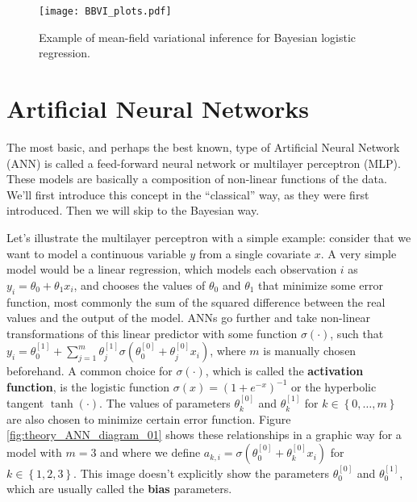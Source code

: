 \begin{figure}[H]
    \centering
    \texttt{[image: BBVI\_plots.pdf]}
    \caption{Example of mean-field variational inference for Bayesian logistic regression.}
    \label{fig:BBVI_plots}
\end{figure}


\section{Artificial Neural Networks}

The most basic, and perhaps the best known, type of Artificial Neural Network (ANN) is called a feed-forward neural network or multilayer perceptron (MLP). These models are basically a composition of non-linear functions of the data. We'll first introduce this concept in the ``classical'' way, as they were first introduced. Then we will skip to the Bayesian way.

Let's illustrate the multilayer perceptron with a simple example: consider that we want to model a continuous variable $y$ from a single covariate $x$. A very simple model would be a linear regression, which models each observation $i$ as $y_i = \theta_0 + \theta_1 x_i$, and chooses the values of $\theta_0$ and $\theta_1$ that minimize some error function, most commonly the sum of the squared difference between the real values and the output of the model. ANNs go further and take non-linear transformations of this linear predictor with some function $\sigma(\cdot)$, such that $y_i = \theta_0^{[1]} +  \sum_{j = 1}^m \theta_j^{[1]} \sigma \left( \theta_0^{[0]} + \theta_j^{[0]} x_i \right)$, where $m$ is manually chosen beforehand. A common choice for $\sigma(\cdot)$, which is called the \textbf{activation function}, is the logistic function $\sigma(x) = (1 + e^{-x})^{-1}$
or the hyperbolic tangent $\tanh(\cdot)$. The values of parameters $\theta_k^{[0]}$ and $\theta_k^{[1]}$ for $k \in \left\{ 0, \ldots, m \right\}$ are also chosen to minimize certain error function. Figure \ref{fig:theory_ANN_diagram_01} shows these relationships in a graphic way for a model with $m = 3$ and where we define $a_{k, i} = \sigma \left( \theta_0^{[0]} + \theta_k^{[0]} x_i \right)$ for $k \in \left\{ 1, 2, 3 \right\}$.
This image doesn't explicitly show the parameters $\theta_0^{[0]}$ and $\theta_0^{[1]}$, which are usually called the \textbf{bias} parameters.


